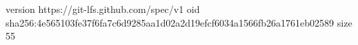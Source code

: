 version https://git-lfs.github.com/spec/v1
oid sha256:4e565103fe37f6fa7c6d9285aa1d02a2d19efcf6034a1566fb26a1761eb02589
size 55
